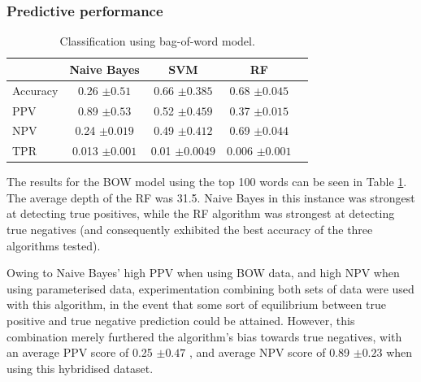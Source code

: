 \subsubsection{Predictive performance}



 
 
 \begin{table}[h]
 \begin{center}

   \caption{Classification using bag-of-word model.}
\begin{tabular}{|l|c|c|c|c|}
\hline
            & \textbf{Naive Bayes\index{Naïve Bayes}} & \textbf{SVM} & \textbf{RF} \\ \hline
Accuracy    & 0.26 $\pm 0.51$                & 0.66 $\pm 0.385$     & 0.68 $\pm 0.045$        \\ \hline
PPV         & 0.89 $\pm 0.53$               & 0.52  $\pm 0.459$    & 0.37 $\pm 0.015$            \\ \hline
NPV         & 0.24 $\pm 0.019$               & 0.49 $\pm 0.412$     & 0.69 $\pm 0.044$           \\ \hline
TPR         & 0.013 $\pm 0.001$               & 0.01 $\pm 0.0049$     & 0.006 $\pm 0.001$           \\ \hline
\end{tabular}
\label{table:ml-classification-bow}
 \end{center}
\end{table}

The results for the BOW model using the top 100 words can be seen in Table \ref{table:ml-classification-bow}. The average depth of the RF was 31.5. Naive Bayes in this instance was strongest at detecting true positives, while the RF algorithm was strongest at detecting true negatives (and consequently exhibited the best accuracy of the three algorithms tested).  

Owing to Naive Bayes' high PPV when using BOW data, and high NPV when using parameterised data, experimentation combining both sets of data were used with this algorithm, in the event that some sort of equilibrium between true positive and true negative prediction could be attained. However, this combination merely furthered the algorithm's bias towards true negatives, with an average PPV score of 0.25 $\pm 0.47$ , and average NPV score of 0.89 $\pm 0.23$  when using this hybridised dataset.



